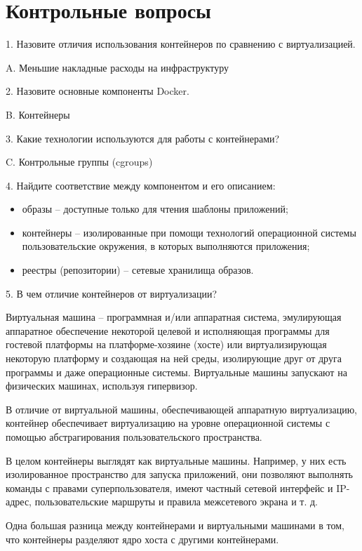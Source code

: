 \section*{Контрольные вопросы}

1. Назовите  отличия  использования  контейнеров  по  сравнению  с виртуализацией. 

A. Меньшие накладные расходы на инфраструктуру

2. Назовите основные компоненты Docker. 

B. Контейнеры

3. Какие технологии используются для работы с контейнерами?

C. Контрольные группы (cgroups)

4. Найдите соответствие между компонентом и его описанием:
\begin{itemize}
    \item образы -- доступные только для чтения шаблоны приложений;
    \item контейнеры -- изолированные при помощи технологий операционной системы пользовательские окружения, в которых выполняются приложения;
    \item реестры (репозитории) – сетевые хранилища образов.
\end{itemize}

5. В чем отличие контейнеров от виртуализации?

Виртуальная машина – программная и/или аппаратная система, эмулирующая аппаратное обеспечение некоторой целевой и исполняющая программы для гостевой платформы на платформе-хозяине (хосте) или виртуализирующая некоторую платформу и создающая на ней среды, изолирующие друг от друга программы и даже операционные системы. Виртуальные машины запускают на физических машинах, используя гипервизор.

В отличие от виртуальной машины, обеспечивающей аппаратную виртуализацию, контейнер обеспечивает виртуализацию на уровне операционной системы с помощью абстрагирования пользовательского пространства.

В целом контейнеры выглядят как виртуальные машины. Например, у них есть изолированное пространство для запуска приложений, они позволяют выполнять команды с правами суперпользователя, имеют частный сетевой интерфейс и IP-адрес, пользовательские маршруты и правила межсетевого экрана и т. д.

Одна большая разница между контейнерами и виртуальными машинами в том, что контейнеры разделяют ядро хоста с другими контейнерами.

